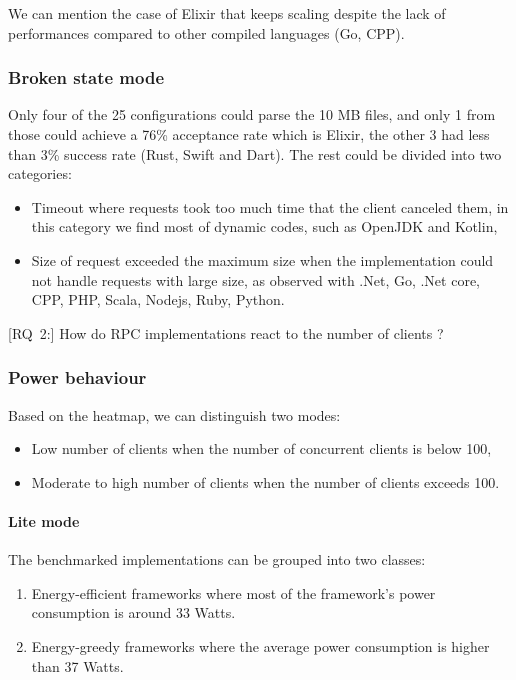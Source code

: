 We can mention the case of Elixir that keeps scaling despite the lack of performances compared to other compiled languages (Go, CPP).

\subsubsection{Broken state mode }
Only four of the 25 configurations could parse the 10 MB files, and only 1 from those could achieve a 76\% acceptance rate which is Elixir, the other 3 had less than 3\% success rate (Rust, Swift and Dart).
The rest could be divided into two categories:
\begin{itemize}
    \item \textsf{Timeout} where requests took too much time that the client canceled them, in this category we find most of dynamic codes, such as OpenJDK and Kotlin,
    \item \textsf{Size of request} exceeded the maximum size when the implementation could not handle requests with large size, as observed with .Net, Go, .Net core, CPP, PHP, Scala, Nodejs, Ruby, Python.
\end{itemize}


[\textsc{RQ}~2:] How do RPC implementations react to the number of clients ?

\subsubsection{Power behaviour}
Based on the heatmap, we can distinguish two modes:
\begin{itemize}
    \item \textsf{Low number of clients} when the number of concurrent clients is below 100,
    \item \textsf{Moderate to high number of clients} when the number of clients exceeds 100.
\end{itemize}


\paragraph{Lite mode}
The benchmarked implementations can be grouped into two classes:
\begin{enumerate}
    \item \textsf{Energy-efficient frameworks} where most of the framework's power consumption is around 33 Watts.
    \item \textsf{Energy-greedy frameworks} where the average power consumption is higher than 37 Watts.
\end{enumerate}

